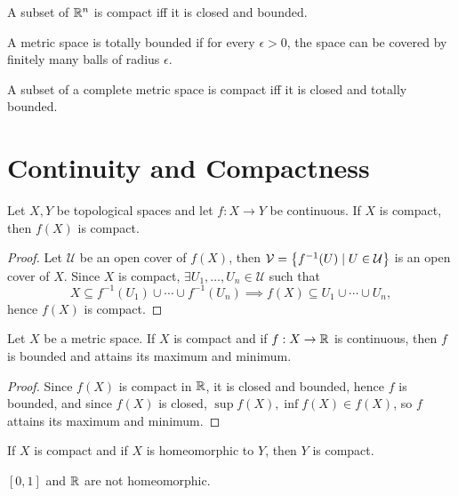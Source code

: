 \begin{cl}
    A subset of ${\mathbb R}^n$ is compact iff it is closed and bounded.    
\end{cl}

\begin{df}
    A metric space is totally bounded if for every $\epsilon > 0$, the space can be covered by finitely many balls of radius $\epsilon$.
\end{df}

\begin{thm}
    A subset of a complete metric space is compact iff it is closed and totally bounded.
\end{thm}

\section{Continuity and Compactness}

\begin{prop}
    Let $X, Y$ be topological spaces and let $f: X \to Y$ be continuous. If $X$ is compact, then $f(X)$ is compact.
    \begin{proof}
        Let $\mathcal U$ be an open cover of $f(X)$, then $\mathcal V = {\left\{{f^{-1}(U) \mid U\in \mathcal U}\right\}}$ is an open cover of $X$. Since $X$ is compact, $\exists U_1, \ldots, U_n \in \mathcal U$ such that
        \[
        X \subseteq f^{-1}(U_1) \cup \cdots \cup f^{-1}(U_n) \implies f(X) \subseteq U_1 \cup \cdots \cup U_n,
        \]
        hence $f(X)$ is compact.
    \end{proof}
\end{prop}

\begin{cl}
    Let $X$ be a metric space. If $X$ is compact and if $f: X \to {\mathbb R}$ is continuous, then $f$ is bounded and attains its maximum and minimum.
    \begin{proof}
        Since $f(X)$ is compact in ${\mathbb R}$, it is closed and bounded, hence $f$ is bounded, and since $f(X)$ is closed, $\sup f(X), \inf f(X) \in f(X)$, so $f$ attains its maximum and minimum.
    \end{proof}
\end{cl}

\begin{cl}
    If $X$ is compact and if $X$ is homeomorphic to $Y$, then $Y$ is compact.
\end{cl}

\begin{cl}
    $[0, 1]$ and ${\mathbb R}$ are not homeomorphic.
\end{cl}

